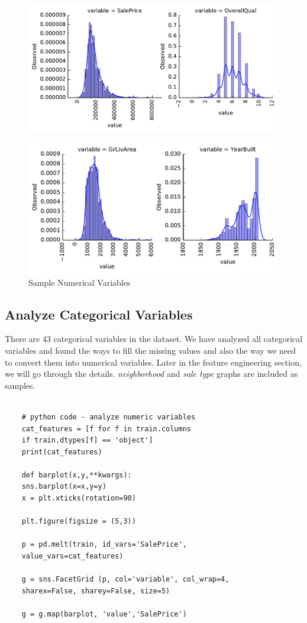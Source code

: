 \documentclass[sigconf]{acmart}
\begin{document}
	\begin{figure}[H]
		\centering
		\includegraphics[width=0.75\columnwidth]{images/num_features_1}			
	\end{figure}
	
	\begin{figure}[H]
		\centering
		\includegraphics[width=0.75\columnwidth]{images/num_features_2}	
		\caption{Sample Numerical Variables} \label{fig:num_features_2} 
	\end{figure}
	
	\subsection{Analyze Categorical Variables}
	There are 43 categorical variables in the dataset. We have analyzed all categorical variables and found the ways to fill the missing values and also the way we need to convert them into numerical variables. Later in the feature engineering section, we will go through the details. {\em neighborhood} and {\em sale type} graphs are included as samples.
	\begin{verbatim}
	
	# python code - analyze numeric variables
	cat_features = [f for f in train.columns 
	if train.dtypes[f] == 'object']
	print(cat_features)
	
	def barplot(x,y,**kwargs):
	sns.barplot(x=x,y=y)
	x = plt.xticks(rotation=90)
	
	plt.figure(figsize = (5,3))
	
	p = pd.melt(train, id_vars='SalePrice',
	value_vars=cat_features)
	
	g = sns.FacetGrid (p, col='variable', col_wrap=4, 
	sharex=False, sharey=False, size=5)
	
	g = g.map(barplot, 'value','SalePrice')				
	\end{verbatim}
	
\end{document}
